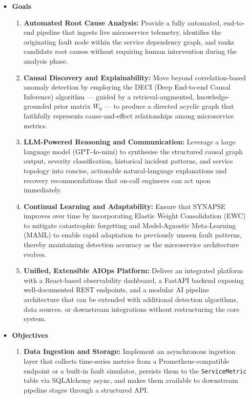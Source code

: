 \begin{itemize}

    \item \textbf{Goals}
    \begin{enumerate}
        \item \textbf{Automated Root Cause Analysis:} Provide a fully automated, end-to-end pipeline that ingests live microservice telemetry, identifies the originating fault node within the service dependency graph, and ranks candidate root causes without requiring human intervention during the analysis phase.

        \item \textbf{Causal Discovery and Explainability:} Move beyond correlation-based anomaly detection by employing the DECI (Deep End-to-end Causal Inference) algorithm — guided by a retrieval-augmented, knowledge-grounded prior matrix $W_0$ — to produce a directed acyclic graph that faithfully represents cause-and-effect relationships among microservice metrics.

        \item \textbf{LLM-Powered Reasoning and Communication:} Leverage a large language model (GPT-4o-mini) to synthesise the structured causal graph output, severity classification, historical incident patterns, and service topology into concise, actionable natural-language explanations and recovery recommendations that on-call engineers can act upon immediately.

        \item \textbf{Continual Learning and Adaptability:} Ensure that SYNAPSE improves over time by incorporating Elastic Weight Consolidation (EWC) to mitigate catastrophic forgetting and Model-Agnostic Meta-Learning (MAML) to enable rapid adaptation to previously unseen fault patterns, thereby maintaining detection accuracy as the microservice architecture evolves.

        \item \textbf{Unified, Extensible AIOps Platform:} Deliver an integrated platform with a React-based observability dashboard, a FastAPI backend exposing well-documented REST endpoints, and a modular AI pipeline architecture that can be extended with additional detection algorithms, data sources, or downstream integrations without restructuring the core system.
    \end{enumerate}

    \item \textbf{Objectives}
    \begin{enumerate}
        \item \textbf{Data Ingestion and Storage:} Implement an asynchronous ingestion layer that collects time-series metrics from a Prometheus-compatible endpoint or a built-in fault simulator, persists them to the \texttt{ServiceMetric} table via SQLAlchemy async, and makes them available to downstream pipeline stages through a structured API.


\end{enumerate}
\end{itemize}
